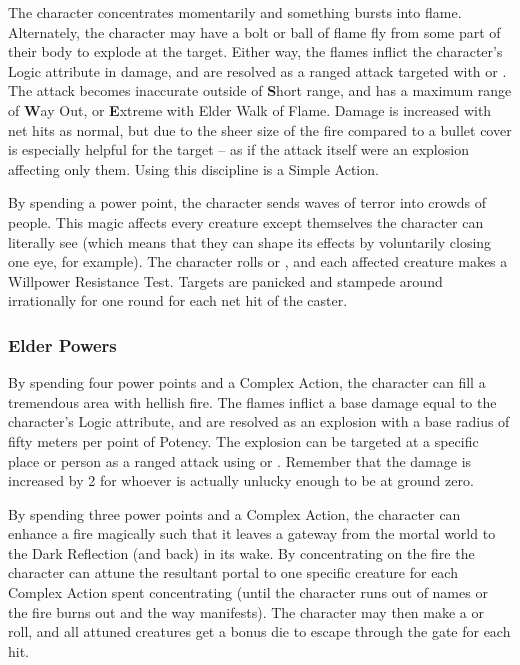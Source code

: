  The character concentrates momentarily and something bursts into flame. Alternately, the character may have a bolt or ball of flame fly from some part of their body to explode at the target. Either way, the flames inflict the character's Logic attribute in damage, and are resolved as a ranged attack targeted with  or . The attack becomes inaccurate outside of \textbf{S}hort range, and has a maximum range of \textbf{W}ay Out, or \textbf{E}xtreme with Elder Walk of Flame. Damage is increased with net hits as normal, but due to the sheer size of the fire compared to a bullet cover is especially helpful for the target -- as if the attack itself were an explosion affecting only them. Using this discipline is a Simple Action.

 By spending a power point, the character sends waves of terror into crowds of people. This magic affects every creature except themselves the character can literally see (which means that they can shape its effects by voluntarily closing one eye, for example). The character rolls  or , and each affected creature makes a Willpower Resistance Test. Targets are panicked and stampede around irrationally for one round for each net hit of the caster.

\subsubsection{Elder Powers}

 By spending four power points and a Complex Action, the character can fill a tremendous area with hellish fire. The flames inflict a base damage equal to the character's Logic attribute, and are resolved as an explosion with a base radius of fifty meters per point of Potency. The explosion can be targeted at a specific place or person as a ranged attack using  or . Remember that the damage is increased by 2 for whoever is actually unlucky enough to be at ground zero.

 By spending three power points and a Complex Action, the character can enhance a fire magically such that it leaves a gateway from the mortal world to the Dark Reflection (and back) in its wake. By concentrating on the fire the character can attune the resultant portal to one specific creature for each Complex Action spent concentrating (until the character runs out of names or the fire burns out and the way manifests). The character may then make a  or  roll, and all attuned creatures get a bonus die to escape through the gate for each hit.


